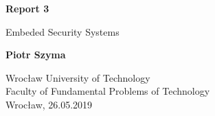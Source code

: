 \begin{titlepage}
  \begin{center}
      \vspace*{1cm}

      \textbf{Report 3}

      \vspace{0.5cm}
       Embeded Security Systems

      \vspace{1.5cm}

      \textbf{Piotr Szyma}

      \vfill

      \vspace{0.8cm}

      Wrocław University of Technology\\
      Faculty of Fundamental Problems of Technology\\
      Wrocław, 26.05.2019

  \end{center}
\end{titlepage}